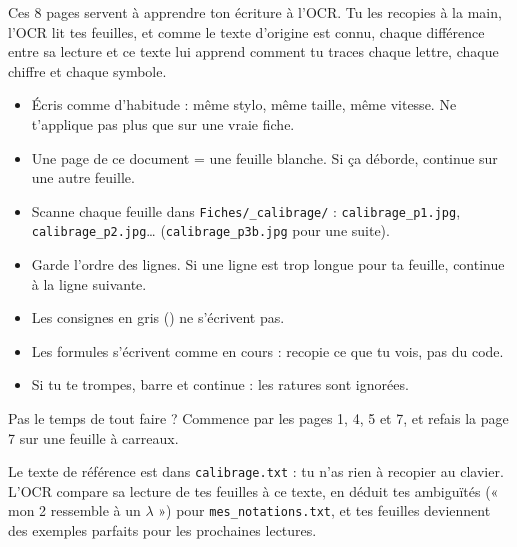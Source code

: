 \documentclass[11pt]{article}
\begin{document}

Ces 8 pages servent à apprendre ton écriture à l'OCR. Tu les recopies à la main, l'OCR lit tes feuilles, et comme le texte d'origine est connu, chaque différence entre sa lecture et ce texte lui apprend comment tu traces chaque lettre, chaque chiffre et chaque symbole.

\begin{methode}
\begin{itemize}
\item Écris comme d'habitude : même stylo, même taille, même vitesse. Ne t'applique pas plus que sur une vraie fiche.
\item Une page de ce document = une feuille blanche. Si ça déborde, continue sur une autre feuille.
\item Scanne chaque feuille dans \texttt{Fiches/\_calibrage/} : \texttt{calibrage\_p1.jpg}, \texttt{calibrage\_p2.jpg}… (\texttt{calibrage\_p3b.jpg} pour une suite).
\item Garde l'ordre des lignes. Si une ligne est trop longue pour ta feuille, continue à la ligne suivante.
\item Les consignes en gris () ne s'écrivent pas.
\item Les formules s'écrivent comme en cours : recopie ce que tu vois, pas du code.
\item Si tu te trompes, barre et continue : les ratures sont ignorées.
\end{itemize}
\end{methode}

\begin{attention}
Pas le temps de tout faire ? Commence par les pages 1, 4, 5 et 7, et refais la page 7 sur une feuille à carreaux.
\end{attention}

\begin{remarque}
Le texte de référence est dans \texttt{calibrage.txt} : tu n'as rien à recopier au clavier. L'OCR compare sa lecture de tes feuilles à ce texte, en déduit tes ambiguïtés (« mon 2 ressemble à un $\lambda$ ») pour \texttt{mes\_notations.txt}, et tes feuilles deviennent des exemples parfaits pour les prochaines lectures.
\end{remarque}


\clearpage
{}
\end{document}
